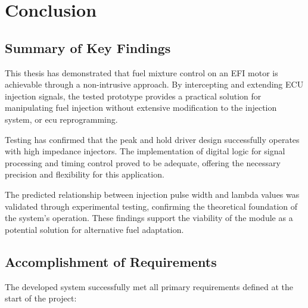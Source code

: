 
\chapter{Conclusion}
    \section{Summary of Key Findings}

        This thesis has demonstrated that fuel mixture control on an EFI motor is achievable through a non-intrusive approach. By intercepting and extending ECU injection signals, the tested prototype provides a practical solution for manipulating fuel injection without extensive modification to the injection system, or \gls{ecu} reprogramming.
        
        Testing has confirmed that the peak and hold driver design successfully operates with high impedance injectors. The implementation of digital logic for signal processing and timing control proved to be adequate, offering the necessary precision and flexibility for this application.
        
        The predicted relationship between injection pulse width and lambda values was validated through experimental testing, confirming the theoretical foundation of the system's operation. These findings support the viability of the module as a potential solution for alternative fuel adaptation.

    \section{Accomplishment of Requirements}

        The developed system successfully met all primary requirements defined at the start of the project:
        
